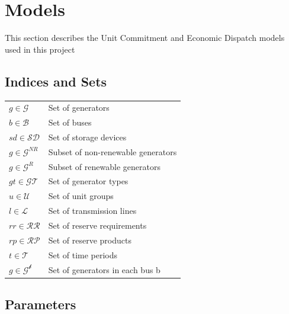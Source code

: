 \documentclass[12pt,LUDisStyle,twosided]{book}
\newcommand{\mc}{\mathcal}
\begin{document}
\section{Models}

This section describes the Unit Commitment and Economic Dispatch models used in this project

\subsection{Indices and Sets}

\begin{tabular}{ll}

$g \in \mc{G} $& Set of generators\\
$b \in \mc{B} $& Set of buses\\
$sd \in \mc{SD} $& Set of storage devices\\
$g \in \mc{G}^{NR} $& Subset of non-renewable generators\\
$g \in \mc{G}^{R} $& Subset of renewable generators \\
$gt \in \mc{GT} $& Set of generator types \\
$u \in \mc{U} $& Set of unit groups \\
$l \in \mc{L} $& Set of transmission lines \\
$rr \in \mc{RR} $& Set of reserve requirements \\
$rp \in \mc{RP} $& Set of reserve products \\
$t \in \mc{T} $& Set of time periods \\
$g \in \mc{G^{b}} $& Set of generators in each bus b \\


\end{tabular}

\subsection{Parameters}
\end{document}
